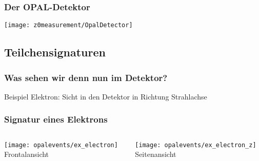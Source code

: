  \begin{frame}
   \frametitle{Der OPAL-Detektor}
   \begin{center}
     \texttt{[image: z0measurement/OpalDetector]}
   \end{center}
 \end{frame}

 \subsection{Teilchensignaturen}
 \begin{frame}
   \frametitle{Was sehen wir denn nun im Detektor?}
   \alert{Beispiel Elektron}: Sicht in den Detektor in Richtung Strahlachse
 \end{frame}

 \begin{frame}
   \frametitle{Signatur eines Elektrons}
   \begin{columns}
     \begin{column}{0.5\textwidth}
       \centering
       \texttt{[image: opalevents/ex\_electron]}\\
       Frontalansicht
     \end{column}
     \begin{column}{0.5\textwidth}
       \centering
       \texttt{[image: opalevents/ex\_electron\_z]}\\
       Seitenansicht
     \end{column}
  \end{columns}
 \end{frame}

